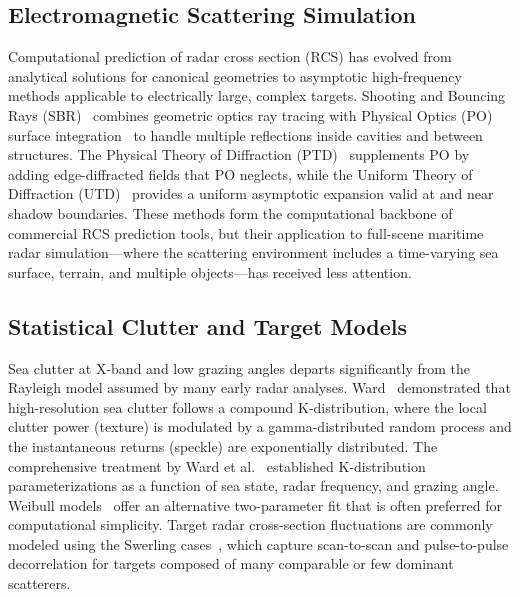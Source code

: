 \documentclass[conf]{new-aiaa}
\begin{document}
\subsection{Electromagnetic Scattering Simulation}
Computational prediction of radar cross section (RCS) has evolved from analytical solutions for canonical geometries to asymptotic high-frequency methods applicable to electrically large, complex targets. Shooting and Bouncing Rays (SBR)~\cite{Ling1989} combines geometric optics ray tracing with Physical Optics (PO) surface integration~\cite{Gordon1975} to handle multiple reflections inside cavities and between structures. The Physical Theory of Diffraction (PTD)~\cite{Ufimtsev2007} supplements PO by adding edge-diffracted fields that PO neglects, while the Uniform Theory of Diffraction (UTD)~\cite{Kouyoumjian1974} provides a uniform asymptotic expansion valid at and near shadow boundaries. These methods form the computational backbone of commercial RCS prediction tools, but their application to full-scene maritime radar simulation---where the scattering environment includes a time-varying sea surface, terrain, and multiple objects---has received less attention.

\subsection{Statistical Clutter and Target Models}
Sea clutter at X-band and low grazing angles departs significantly from the Rayleigh model assumed by many early radar analyses. Ward~\cite{Ward1981} demonstrated that high-resolution sea clutter follows a compound K-distribution, where the local clutter power (texture) is modulated by a gamma-distributed random process and the instantaneous returns (speckle) are exponentially distributed. The comprehensive treatment by Ward et al.~\cite{Ward2013} established K-distribution parameterizations as a function of sea state, radar frequency, and grazing angle. Weibull models~\cite{Sekine1981} offer an alternative two-parameter fit that is often preferred for computational simplicity. Target radar cross-section fluctuations are commonly modeled using the Swerling cases~\cite{Swerling1960}, which capture scan-to-scan and pulse-to-pulse decorrelation for targets composed of many comparable or few dominant scatterers.
\end{document}
